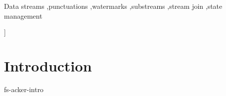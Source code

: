\documentclass[review,%
10pt,twocolumn%
]{elsarticle}
\newcommand {\tracker} {trAcker}
\begin{document}
{\begin{frontmatter}
\begin{abstract}
A common problem in distributed stream processing is to split a stream into finite chunks of messages (substreams) and to determine their boundaries: stateful streaming operators should clear outdated state; time window operators should release output after all elements within the specified time range have arrived. Most state-of-the-art SPEs use punctuations to divide a stream into bounded substreams of messages. The punctuation approach is powerful but has limitations: it does not support cyclic dataflows, is poorly scalable in some cases due to intensive use of broadcasts, and becomes inefficient when the number of chunks or cluster size becomes significant. We introduce a new substream tracking technique called \tracker\ that overcomes the limits of punctuations. We experimentally evaluate the properties of \tracker\ in both synthetic and real-world environments. Experiments show that our technique is scalable, outperforms punctuations for a large number of substreams, and efficiently handles real-world cyclic dataflows.
\end{abstract}

\begin{keyword}
Data streams \sep punctuations \sep watermarks \sep substreams \sep stream join \sep state management
\end{keyword}

\end{frontmatter}
}]







\section {Introduction}
 {fs-acker-intro}
\end{document}
